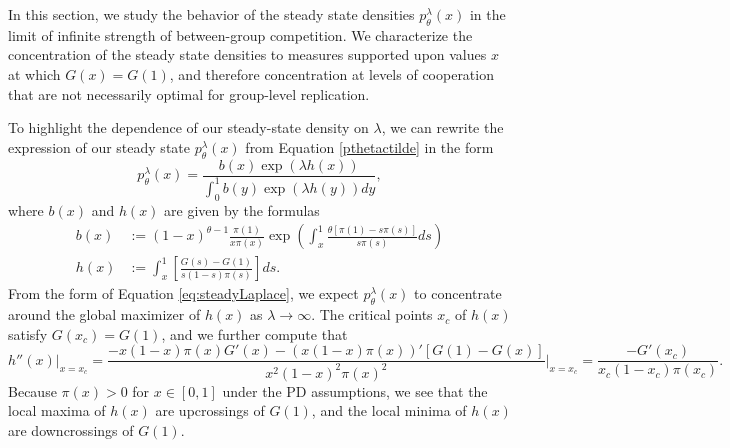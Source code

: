 \documentclass[11pt]{article}
\numberwithin{equation}{section}
\begin{document}
{In this section, we study the behavior of the steady state densities $p^{\lambda}_{\theta}(x)$ in the limit of infinite strength of between-group competition. We characterize the concentration of the steady state densities to measures supported upon values $x$ at which $G(x) = G(1)$, and therefore concentration at levels of cooperation that are not necessarily optimal for group-level replication.

To highlight the dependence of our steady-state density on $\lambda$, we can rewrite the expression of our steady state $p^{\lambda}_{\theta}(x)$ from Equation \eqref{pthetactilde} in the form 
 \begin{equation} \label{eq:steadyLaplace}
 p^{\lambda}_{\theta}(x) = \frac{b(x) \exp\left( \lambda h(x)\right) }{ \int_0^1 b(y) \exp\left( \lambda h(y) \right) dy },
 \end{equation}
 where $b(x)$ and $h(x)$ are given by the formulas 
 \begin{subequations} \label{eq:Laplacefunctions}
 \begin{align} 
 b(x) &:=  \left( 1 - x\right)^{\theta - 1} \frac{\pi(1)}{ x \pi(x)} \exp \left(\int_x^1 \frac{\theta \left[ \pi(1) - s \pi(s)\right]}{s \pi(s)} ds \right) \\
 h(x) &:= \int_x^1 \left[\frac{G(s) - G(1)}{s(1-s) \pi(s)}\right] ds.
 \end{align}
 \end{subequations}
 From the form of Equation \eqref{eq:steadyLaplace},  we expect $p^{\lambda}_{\theta}(x)$ to concentrate around the global maximizer of $h(x)$ as $\lambda \to \infty$. The critical points $x_c$ of $h(x)$ satisfy $G(x_c) = G(1)$, and we further compute that 
\[h''(x) \bigg|_{x = x_c} = \frac{-x(1-x) \pi(x) G'(x) - \left(x(1-x) \pi(x)\right)' \left[ G(1) - G(x) \right]}{x^2 (1-x)^2 \pi(x)^2} \bigg|_{x = x_c} = \frac{-G'(x_c)}{x_c (1-x_c) \pi(x_c)}.  \]
Because $\pi(x) > 0$ for $x \in [0,1]$ under the PD assumptions, we see that the local maxima of $h(x)$ are upcrossings of $G(1)$, and the local minima of $h(x)$ are downcrossings of $G(1)$. 

}
\end{document}
